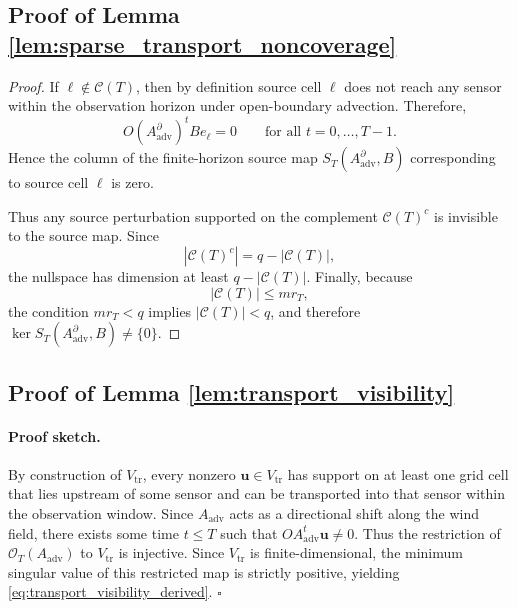 \subsection{Proof of Lemma \ref{lem:sparse_transport_noncoverage}}
\label{sec:proof_lemma_sparse_transport_noncoverage}
\begin{proof}
If \(\ell\notin \mathcal C(T)\), then by definition source cell \(\ell\)
does not reach any sensor within the observation horizon under
open-boundary advection. Therefore,
\[
O(A_{\mathrm{adv}}^{\partial})^t B e_\ell = 0
\qquad
\text{for all } t=0,\ldots,T-1.
\]
Hence the column of the finite-horizon source map
\(S_T(A_{\mathrm{adv}}^{\partial},B)\) corresponding to source cell
\(\ell\) is zero.

Thus any source perturbation supported on the complement
\(\mathcal C(T)^c\) is invisible to the source map. Since
\[
|\mathcal C(T)^c| = q-|\mathcal C(T)|,
\]
the nullspace has dimension at least \(q-|\mathcal C(T)|\). Finally,
because
\[
|\mathcal C(T)|
\le
m r_T,
\]
the condition \(m r_T<q\) implies \(|\mathcal C(T)|<q\), and therefore
\(\ker S_T(A_{\mathrm{adv}}^{\partial},B)\neq\{0\}\).
\end{proof}


\subsection{Proof of Lemma \ref{lem:transport_visibility}}
\label{sec:proof_lemma_transport_visibility}
\paragraph{Proof sketch.}
By construction of $V_{\mathrm{tr}}$, every nonzero $\mathbf{u}\in V_{\mathrm{tr}}$ has support on at least one grid cell that lies upstream of some sensor and can be transported into that sensor within the observation window. Since $A_{\mathrm{adv}}$ acts as a directional shift along the wind field, there exists some time $t\le T$ such that $OA_{\mathrm{adv}}^t \mathbf{u}\neq 0$. Thus the restriction of $\mathcal{O}_T(A_{\mathrm{adv}})$ to $V_{\mathrm{tr}}$ is injective. Since $V_{\mathrm{tr}}$ is finite-dimensional, the minimum singular value of this restricted map is strictly positive, yielding \eqref{eq:transport_visibility_derived}. \hfill $\square$


